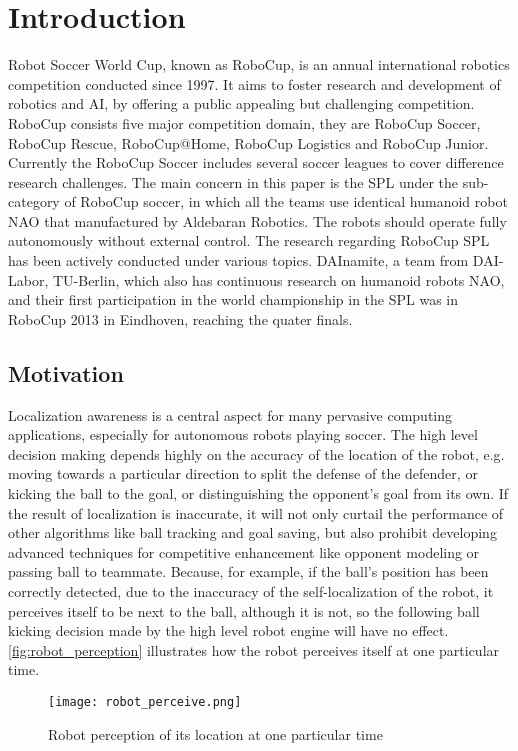 \chapter{Introduction\label{cha:chapter1}}

Robot Soccer World Cup, known as RoboCup, is an annual international robotics competition conducted since 1997. It aims to foster research and development of robotics and \gls{AI}, by offering a public appealing but challenging competition. RoboCup consists five major competition domain, they are RoboCup Soccer, RoboCup Rescue, RoboCup@Home, RoboCup Logistics and RoboCup Junior. Currently the RoboCup Soccer includes several soccer leagues to cover difference research challenges. The main concern in this paper is the \gls{SPL} under the sub-category of RoboCup soccer, in which all the teams use identical humanoid robot NAO that manufactured by Aldebaran Robotics{\textregistered}. The robots should operate fully autonomously without external control. 
The research regarding RoboCup \gls{SPL} has been actively conducted under various topics. DAInamite, a team from DAI-Labor, TU-Berlin, which also has continuous research on humanoid robots NAO, and their first participation in the world championship in the SPL was in RoboCup 2013 in Eindhoven, reaching the quater finals. %

\section{Motivation\label{sec:moti}}
Localization awareness is a central aspect for many pervasive computing applications, especially for autonomous robots playing soccer. The high level decision making depends highly on the accuracy of the location of the robot, e.g. moving towards a particular direction to split the defense of the defender, or kicking the ball to the goal, or distinguishing the opponent's goal from its own. If the result of localization is inaccurate, it will not only curtail the performance of other algorithms like ball tracking and goal saving, but also prohibit developing advanced techniques for competitive enhancement like opponent modeling or passing ball to teammate. Because, for example, if the ball's position has been correctly detected, due to the inaccuracy of the self-localization of the robot, it perceives itself to be next to the ball, although it is not, so the following ball kicking decision made by the high level robot engine will have no effect. \autoref{fig:robot_perception} illustrates how the robot perceives itself at one particular time.
\begin{figure}[h]
  \centering
  \texttt{[image: robot\_perceive.png]}
  \caption{Robot perception of its location at one particular time~\cite{Quinlan2010}}
  \label{fig:robot_perception}
\end{figure}

